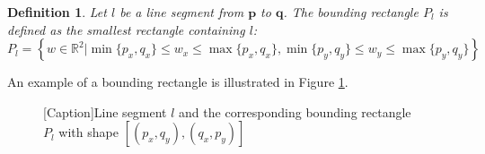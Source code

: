 \documentclass{article}
\renewcommand{\vec}[1]{\mathbf{#1}}
\newtheorem{newdef}{Definition}
\begin{document}
\begin{newdef}
	Let $l$ be a line segment from $\vec{p}$ to $\vec{q}$. The bounding rectangle $P_l$ is defined as the smallest rectangle containing $l$:
	\begin{equation}
		P_l = \left\{ w\in\mathbb{R}^2| \min\{p_x,q_x\} \leq w_x \leq \max\{p_x,q_x\}, \min\{p_y,q_y\} \leq w_y \leq \max\{p_y,q_y\}  \right\}
		\label{eq:bounding_rect}
	\end{equation}
\end{newdef}
\noindent
An example of a bounding rectangle is illustrated in Figure \ref{fig:bounding_rect_ex}.
\begin{figure}
	\centering
	[Caption]{Line segment $l$ and the corresponding bounding rectangle $P_l$ with shape $[(p_x,q_y),(q_x,p_y)]$}
	\label{fig:bounding_rect_ex}
\end{figure}
\end{document}
